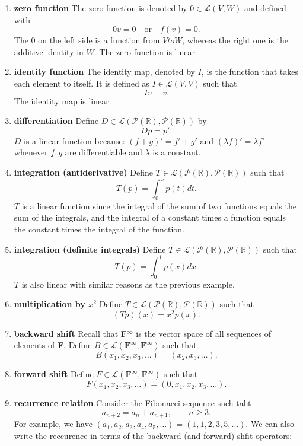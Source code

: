\documentclass[11pt]{article}
\begin{document}
    \begin{enumerate}
        \item \textbf{zero function} The zero function is denoted by \(0 \in \mathcal{L}(V,W)\) and defined with \[0v = 0 \quad \text{or} \quad f(v) = 0.\] The 0 on the left side is a function from \(V to W\), whereas the right one is the additive identity in $W$. The zero function is linear.
        \item \textbf{identity function} The identity map, denoted by $I$, is the function that takes each element to itself. It is defined as \(I \in \mathcal{L}(V,V)\) such that \[Iv = v.\] The identity map is linear.
        \item \textbf{differentiation} Define \(D \in \mathcal{L}(\mathcal{P}(\mathbb{R}), \mathcal{P}(\mathbb{R}))\) by \[Dp = p'.\] $D$ is a linear function because: \((f + g)' = f' + g'\) and \((\lambda f)' = \lambda f'\) whenever $f,g$ are differentiable and $\lambda$ is a constant.
        \item \textbf{integration (antiderivative)} Define \(T \in \mathcal{L}(\mathcal{P}(\mathbb{R}), \mathcal{P}(\mathbb{R}))\) such that \[T(p) = \int_{0}^{x} p(t) dt.\] $T$ is a linear function since the integral of the sum of two functions equals the sum of the integrals, and the integral of a constant times a function equals the constant times the integral of the function. 
        \item \textbf{integration (definite integrals)} Define \(T \in \mathcal{L}(\mathcal{P}(\mathbb{R}), \mathcal{P}(\mathbb{R}))\) such that \[T(p) = \int_{0}^{1} p(x) dx.\] $T$ is also linear with similar reasons as the previous example. 
        \item \textbf{multiplication by \(x^2\)} Define \(T \in \mathcal{L}(\mathcal{P}(\mathbb{R}), \mathcal{P}(\mathbb{R}))\) such that \[(Tp)(x) = x^2 p(x).\]
        \item \textbf{backward shift} Recall that \textbf{F}\(^{\infty}\) is the vector space of all sequences of elements of \textbf{F}. Define \(B \in \mathcal{L}(\textbf{F}^{\infty}, \textbf{F}^{\infty})\) such that \[B(x_1,x_2,x_3, \dots) = (x_2, x_3, \dots).\]
        \item \textbf{forward shift} Define \(F \in \mathcal{L}(\textbf{F}^{\infty}, \textbf{F}^{\infty})\) such that \[F(x_1, x_2, x_3, \dots) = (0, x_1, x_2, x_3, \dots).\]
        \item \textbf{recurrence relation} Consider the Fibonacci sequence such taht \[a_{n+2} = a_n + a_{n+1}, \qquad n \geq 3.\] For example, we have \((a_1, a_2, a_3, a_4, a_5, \dots) = (1,1,2,3,5, \dots). \) We can also write the reccurence in terms of the backward (and forward) shfit operators:

\end{enumerate}
\end{document}
